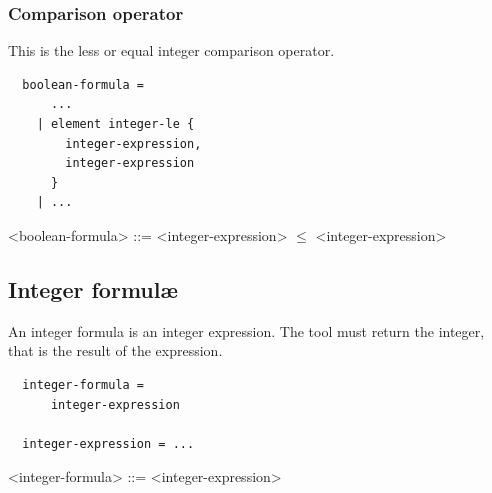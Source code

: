 \documentclass[10pt,english,a4paper]{article}
\begin{document}
\subsubsection{Comparison operator}

This is the less or equal integer comparison operator.


\begin{multicols}{2}
\begin{lstlisting}
  boolean-formula =
      ...
    | element integer-le {
        integer-expression,
        integer-expression
      }
    | ...
\end{lstlisting}
\columnbreak
\scriptsize\begin{grammar}
<boolean-formula> ::= <integer-expression> $\leq$ <integer-expression>
\end{grammar}
\end{multicols}


\subsection{Integer formul{\ae}}

An integer formula is an integer expression.
The tool must return the integer, that is the result of the expression.

\begin{multicols}{2}
\begin{lstlisting}
  integer-formula =
      integer-expression

  integer-expression = ...
\end{lstlisting}
\columnbreak
\scriptsize\begin{grammar}
<integer-formula> ::= <integer-expression>
\end{grammar}
\end{multicols}
\end{document}
